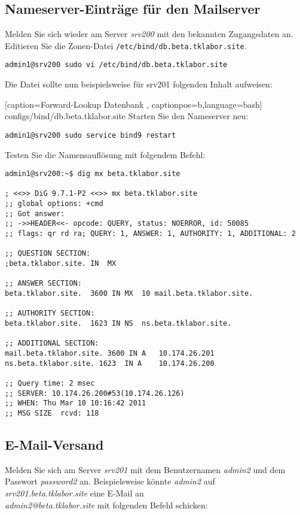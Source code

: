 \subsection{Nameserver-Einträge für den Mailserver}
Melden Sie 
sich wieder am Server \textit{srv200} mit den bekannten Zugangsdaten an.
Editieren Sie die Zonen-Datei \texttt{/etc/bind/db.beta.tklabor.site}.
\begin{lstlisting}
admin1@srv200 sudo vi /etc/bind/db.beta.tklabor.site
\end{lstlisting}
Die Datei sollte nun beispielsweise für srv201 folgenden Inhalt aufweisen:

    [caption={Forward-Lookup Datenbank}
       \label{lst:forware-zone-db},
       captionpos=b,language=bash]
{configs/bind/db.beta.tklabor.site}
Starten Sie den Nameserver neu:
\begin{lstlisting}
admin1@srv200 sudo service bind9 restart
\end{lstlisting}
Testen Sie die Namensauflösung mit folgendem Befehl:
\begin{lstlisting}
admin1@srv200:~$ dig mx beta.tklabor.site

; <<>> DiG 9.7.1-P2 <<>> mx beta.tklabor.site
;; global options: +cmd
;; Got answer:
;; ->>HEADER<<- opcode: QUERY, status: NOERROR, id: 50085
;; flags: qr rd ra; QUERY: 1, ANSWER: 1, AUTHORITY: 1, ADDITIONAL: 2

;; QUESTION SECTION:
;beta.tklabor.site.	IN	MX

;; ANSWER SECTION:
beta.tklabor.site.	3600 IN	MX	10 mail.beta.tklabor.site.

;; AUTHORITY SECTION:
beta.tklabor.site.	1623 IN	NS	ns.beta.tklabor.site.

;; ADDITIONAL SECTION:
mail.beta.tklabor.site. 3600 IN A	10.174.26.201
ns.beta.tklabor.site. 1623	IN A	10.174.26.200

;; Query time: 2 msec
;; SERVER: 10.174.26.200#53(10.174.26.126)
;; WHEN: Thu Mar 10 10:16:42 2011
;; MSG SIZE  rcvd: 118
\end{lstlisting}

\subsection{E-Mail-Versand}
Melden Sie sich am Server \textit{srv201} mit dem Benutzernamen \textit{admin2}
und dem Passwort \textit{password2} an. Beispielsweise könnte \textit{admin2}
auf
\\
\textit{srv201.beta.tklabor.site} eine E-Mail an \\
\textit{admin2@beta.tklabor.site} mit folgenden Befehl schicken:

